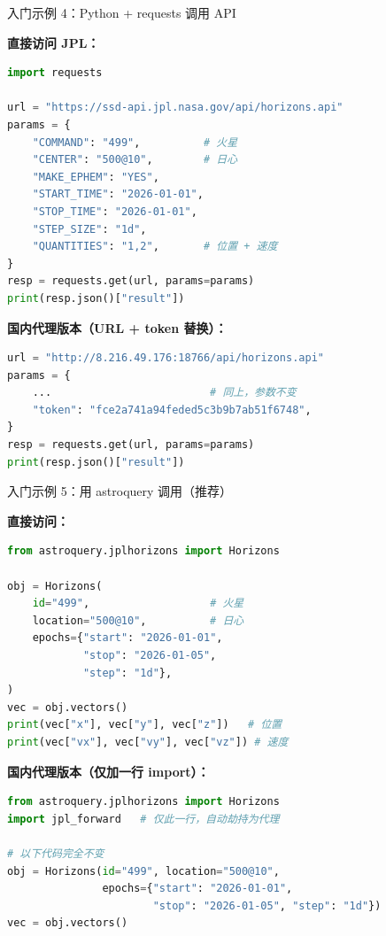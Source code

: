 \documentclass[aspectratio=169]{ctexbeamer}
\begin{document}
\begin{frame}{入门示例 4：Python + requests 调用 API}
\small

\textbf{直接访问 JPL：}

\begin{lstlisting}[language=python]
import requests

url = "https://ssd-api.jpl.nasa.gov/api/horizons.api"
params = {
    "COMMAND": "499",          # 火星
    "CENTER": "500@10",        # 日心
    "MAKE_EPHEM": "YES",
    "START_TIME": "2026-01-01",
    "STOP_TIME": "2026-01-01",
    "STEP_SIZE": "1d",
    "QUANTITIES": "1,2",       # 位置 + 速度
}
resp = requests.get(url, params=params)
print(resp.json()["result"])
\end{lstlisting}

\vspace{0.15cm}

\textbf{国内代理版本（URL + token 替换）：}

\begin{lstlisting}[language=python]
url = "http://8.216.49.176:18766/api/horizons.api"
params = {
    ...                         # 同上，参数不变
    "token": "fce2a741a94feded5c3b9b7ab51f6748",
}
resp = requests.get(url, params=params)
print(resp.json()["result"])
\end{lstlisting}
\end{frame}

\begin{frame}{入门示例 5：用 astroquery 调用（推荐）}
\small

\textbf{直接访问：}

\begin{lstlisting}[language=python]
from astroquery.jplhorizons import Horizons

obj = Horizons(
    id="499",                   # 火星
    location="500@10",          # 日心
    epochs={"start": "2026-01-01",
            "stop": "2026-01-05",
            "step": "1d"},
)
vec = obj.vectors()
print(vec["x"], vec["y"], vec["z"])   # 位置
print(vec["vx"], vec["vy"], vec["vz"]) # 速度
\end{lstlisting}

\vspace{0.15cm}

\textbf{国内代理版本（仅加一行 import）：}

\begin{lstlisting}[language=python]
from astroquery.jplhorizons import Horizons
import jpl_forward   # 仅此一行，自动劫持为代理

# 以下代码完全不变
obj = Horizons(id="499", location="500@10",
               epochs={"start": "2026-01-01",
                       "stop": "2026-01-05", "step": "1d"})
vec = obj.vectors()
\end{lstlisting}
\end{frame}
\end{document}

